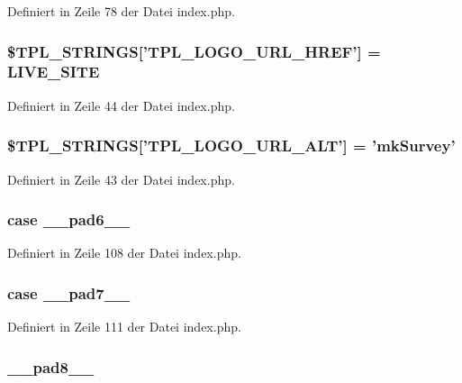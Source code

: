 Definiert in Zeile 78 der Datei index.php.
\subsubsection{\setlength{\rightskip}{0pt plus 5cm}\$TPL\_\-STRINGS['TPL\_\-LOGO\_\-URL\_\-HREF'] = {\bf LIVE\_\-SITE}}\label{index_8php_f614134308603012243af6492ef17d16}




Definiert in Zeile 44 der Datei index.php.
\subsubsection{\setlength{\rightskip}{0pt plus 5cm}\$TPL\_\-STRINGS['TPL\_\-LOGO\_\-URL\_\-ALT'] = 'mkSurvey'}\label{index_8php_9aa87e644839088672b4617618bfb57f}




Definiert in Zeile 43 der Datei index.php.
\subsubsection{\setlength{\rightskip}{0pt plus 5cm}case {\bf \_\-\_\-pad6\_\-\_\-}}\label{index_8php_354ad38ccd8048bf395a26b91a439718}




Definiert in Zeile 108 der Datei index.php.
\subsubsection{\setlength{\rightskip}{0pt plus 5cm}case {\bf \_\-\_\-pad7\_\-\_\-}}\label{index_8php_f8c05c8358b194d7a566f99954d766b1}




Definiert in Zeile 111 der Datei index.php.
\subsubsection{ {\bf \_\-\_\-pad8\_\-\_\-}}\label{index_8php_8c426a51ce608997866538440959e0b8}





